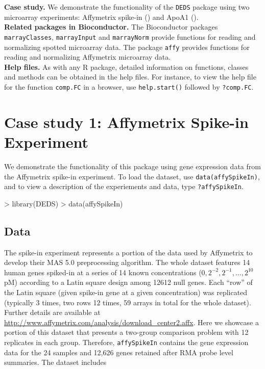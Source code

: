 \documentclass[11pt]{article}
\newcommand{\code}[1]{{\tt #1}}
\newcommand{\Rfunc}[1]{{\tt #1}}
\begin{document}
{\bf Case study.} We demonstrate the functionality of the {\tt DEDS} package using 
two microarray experiments: Affymetrix spike-in (\cite{Irizarryetal03}) and ApoA1
(\cite{Dudoitetal02}). \\

{\bf Related packages in Bioconductor.} The Bioconductor packages \code{marrayClasses}, \code{marrayInput} and \code{marrayNorm} 
provide functions for reading and normalizing spotted microarray data. The package 
\code{affy} provides functions for reading and normalizing Affymetrix microarray data.\\

{\bf Help files.}  As with any R package, detailed information on functions, classes and 
methods can be obtained in the help files. For instance, to view the help file for the 
function \Rfunc{comp.FC} in a browser, use \code{help.start()} followed by \code{?comp.FC}.\\


\section{Case study 1: Affymetrix Spike-in Experiment}
We demonstrate the functionality of this package using gene expression
data from the Affymetrix spike-in experiment. To load the dataset, use
\code{data(affySpikeIn)}, and to view a description of the experiements
and data, type \code{?affySpikeIn}.

\begin{Schunk}
\begin{Sinput}
> library(DEDS)
> data(affySpikeIn)
\end{Sinput}
\end{Schunk}

\subsection{Data}
The spike-in experiment represents a portion of the data used by Affymetrix
to develop their MAS 5.0 preprocessing algorithm.  The whole dataset 
features 14 human genes spiked-in at a series of 14 known concentrations 
($0, 2^{-2}, 2^{-1}, \ldots, 2^{10}$ pM) according to 
a Latin square design among 12612 null genes.  Each ``row'' of the Latin square
(given spike-in gene at a given concentration) was replicated (typically 3 
times, two rows 12 times, 59 arrays in total for the whole dataset).  
Further details are available 
at \url{http://www.affymetrix.com/analysis/download_center2.affx}.  
Here we showcase a portion of this dataset that presents a two-group
comparison problem with 12 replicates in each group.
Therefore, \code{affySpikeIn} contains the gene expression data for the 24
samples and 12,626 genes retained after RMA probe level summaries. The dataset 
includes 
\end{document}
